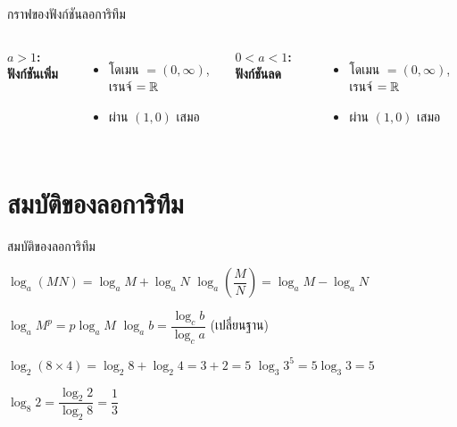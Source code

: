 \documentclass[11pt, aspectratio=169]{beamer}
\begin{document}
\begin{frame}{กราฟของฟังก์ชันลอการิทึม}
  \begin{columns}[T]
      \centering
      \textbf{$a > 1$: ฟังก์ชันเพิ่ม}
      \begin{itemize}
        \item โดเมน $= (0, \infty)$, เรนจ์ $= \mathbb{R}$
        \item ผ่าน $(1,0)$ เสมอ
      \end{itemize}

      \centering
      \textbf{$0 < a < 1$: ฟังก์ชันลด}
      \begin{itemize}
        \item โดเมน $= (0, \infty)$, เรนจ์ $= \mathbb{R}$
        \item ผ่าน $(1,0)$ เสมอ
      \end{itemize}
  \end{columns}
\end{frame}

\section{สมบัติของลอการิทึม}

\begin{frame}{สมบัติของลอการิทึม}
  \begin{explanation}
    $\log_a (MN) = \log_a M + \log_a N$ \qquad
    $\log_a \left(\dfrac{M}{N}\right) = \log_a M - \log_a N$

    $\log_a M^p = p \log_a M$ \qquad
    $\log_a b = \dfrac{\log_c b}{\log_c a}$ \quad (เปลี่ยนฐาน)
  \end{explanation}

  \begin{exambox}[ตัวอย่าง]
    $\log_2 (8 \times 4) = \log_2 8 + \log_2 4 = 3 + 2 = 5$ \quad
    $\log_3 3^5 = 5 \log_3 3 = 5$

    $\log_8 2 = \dfrac{\log_2 2}{\log_2 8} = \dfrac{1}{3}$
  \end{exambox}
\end{frame}
\end{document}
